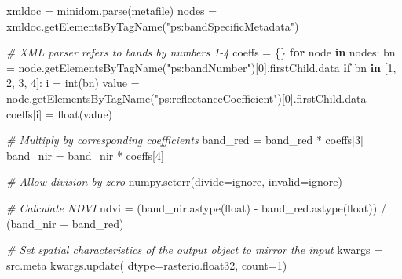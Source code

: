 \documentclass[12pt,twoside]{reedthesis}
\newenvironment{Shaded}{\begin{snugshade}}{\end{snugshade}}
\newcommand{\AttributeTok}[1]{\textcolor[rgb]{0.77,0.63,0.00}{#1}}
\newcommand{\CommentTok}[1]{\textcolor[rgb]{0.56,0.35,0.01}{\textit{#1}}}
\newcommand{\ControlFlowTok}[1]{\textcolor[rgb]{0.13,0.29,0.53}{\textbf{#1}}}
\newcommand{\DecValTok}[1]{\textcolor[rgb]{0.00,0.00,0.81}{#1}}
\newcommand{\FunctionTok}[1]{\textcolor[rgb]{0.00,0.00,0.00}{#1}}
\newcommand{\NormalTok}[1]{#1}
\newcommand{\OtherTok}[1]{\textcolor[rgb]{0.56,0.35,0.01}{#1}}
\newcommand{\SpecialCharTok}[1]{\textcolor[rgb]{0.00,0.00,0.00}{#1}}
\newcommand{\StringTok}[1]{\textcolor[rgb]{0.31,0.60,0.02}{#1}}
\begin{document}
\begin{Shaded}
\begin{Highlighting}[]
\NormalTok{    xmldoc }\OtherTok{=} \FunctionTok{minidom.parse}\NormalTok{(metafile)}
\NormalTok{    nodes }\OtherTok{=} \FunctionTok{xmldoc.getElementsByTagName}\NormalTok{(}\StringTok{"ps:bandSpecificMetadata"}\NormalTok{)}

    \CommentTok{\# XML parser refers to bands by numbers 1{-}4}
\NormalTok{    coeffs }\OtherTok{=}\NormalTok{ \{\}}
    \ControlFlowTok{for}\NormalTok{ node }\ControlFlowTok{in}\NormalTok{ nodes}\SpecialCharTok{:}
\NormalTok{        bn }\OtherTok{=} \FunctionTok{node.getElementsByTagName}\NormalTok{(}\StringTok{"ps:bandNumber"}\NormalTok{)[}\DecValTok{0}\NormalTok{].firstChild.data}
        \ControlFlowTok{if}\NormalTok{ bn }\ControlFlowTok{in}\NormalTok{ [}\StringTok{\textquotesingle{}1\textquotesingle{}}\NormalTok{, }\StringTok{\textquotesingle{}2\textquotesingle{}}\NormalTok{, }\StringTok{\textquotesingle{}3\textquotesingle{}}\NormalTok{, }\StringTok{\textquotesingle{}4\textquotesingle{}}\NormalTok{]}\SpecialCharTok{:}
\NormalTok{            i }\OtherTok{=} \FunctionTok{int}\NormalTok{(bn)}
\NormalTok{            value }\OtherTok{=} \FunctionTok{node.getElementsByTagName}\NormalTok{(}\StringTok{"ps:reflectanceCoefficient"}\NormalTok{)[}\DecValTok{0}\NormalTok{].firstChild.data}
\NormalTok{            coeffs[i] }\OtherTok{=} \FunctionTok{float}\NormalTok{(value)}

    \CommentTok{\# Multiply by corresponding coefficients}
\NormalTok{    band\_red }\OtherTok{=}\NormalTok{ band\_red }\SpecialCharTok{*}\NormalTok{ coeffs[}\DecValTok{3}\NormalTok{]}
\NormalTok{    band\_nir }\OtherTok{=}\NormalTok{ band\_nir }\SpecialCharTok{*}\NormalTok{ coeffs[}\DecValTok{4}\NormalTok{]}

    \CommentTok{\# Allow division by zero}
    \FunctionTok{numpy.seterr}\NormalTok{(}\AttributeTok{divide=}\StringTok{\textquotesingle{}ignore\textquotesingle{}}\NormalTok{, }\AttributeTok{invalid=}\StringTok{\textquotesingle{}ignore\textquotesingle{}}\NormalTok{)}

    \CommentTok{\# Calculate NDVI}
\NormalTok{    ndvi }\OtherTok{=}\NormalTok{ (}\FunctionTok{band\_nir.astype}\NormalTok{(float) }\SpecialCharTok{{-}} \FunctionTok{band\_red.astype}\NormalTok{(float)) }\SpecialCharTok{/}\NormalTok{ (band\_nir }\SpecialCharTok{+}\NormalTok{ band\_red)}

    \CommentTok{\# Set spatial characteristics of the output object to mirror the input}
\NormalTok{    kwargs }\OtherTok{=}\NormalTok{ src.meta}
    \FunctionTok{kwargs.update}\NormalTok{(}
        \AttributeTok{dtype=}\NormalTok{rasterio.float32,}
        \AttributeTok{count=}\DecValTok{1}\NormalTok{)}
    

\end{Highlighting}
\end{Shaded}
\end{document}
